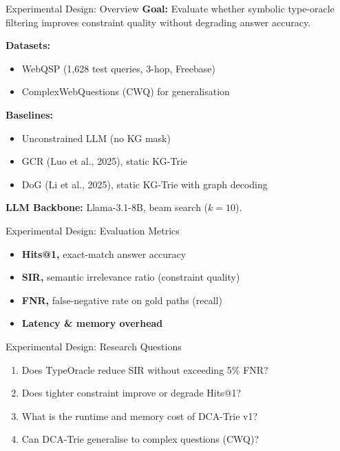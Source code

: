 \documentclass{beamer}
\begin{document}
\begin{frame}{Experimental Design: Overview}
  \textbf{Goal:} Evaluate whether symbolic type-oracle filtering improves constraint quality without degrading answer accuracy.

  \vspace{0.5em}
  \textbf{Datasets:}
  \begin{itemize}
    \item WebQSP (1,628 test queries, 3-hop, Freebase)
    \item ComplexWebQuestions (CWQ) for generalisation
  \end{itemize}

  \vspace{0.5em}
  \textbf{Baselines:}
  \begin{itemize}
    \item Unconstrained LLM (no KG mask)
    \item GCR (Luo et al., 2025), static KG-Trie
    \item DoG (Li et al., 2025), static KG-Trie with graph decoding
  \end{itemize}

  \vspace{0.5em}
  \textbf{LLM Backbone:} Llama-3.1-8B, beam search ($k = 10$).
\end{frame}

\begin{frame}{Experimental Design: Evaluation Metrics}
  \begin{itemize}
    \item \textbf{Hits@1,} exact-match answer accuracy
    \vspace{0.3cm}
    \item \textbf{SIR,} semantic irrelevance ratio (constraint quality)
    \vspace{0.3cm}
    \item \textbf{FNR,} false-negative rate on gold paths (recall)
    \vspace{0.3cm}
    \item \textbf{Latency \& memory overhead}
  \end{itemize}
\end{frame}

\begin{frame}{Experimental Design: Research Questions}
  \begin{enumerate}
    \item Does TypeOracle reduce SIR without exceeding 5\% FNR?
    \vspace{0.3cm}
    \item Does tighter constraint improve or degrade Hits@1?
    \vspace{0.3cm}
    \item What is the runtime and memory cost of DCA-Trie v1?
    \vspace{0.3cm}
    \item Can DCA-Trie generalise to complex questions (CWQ)?
  \end{enumerate}
\end{frame}
\end{document}
